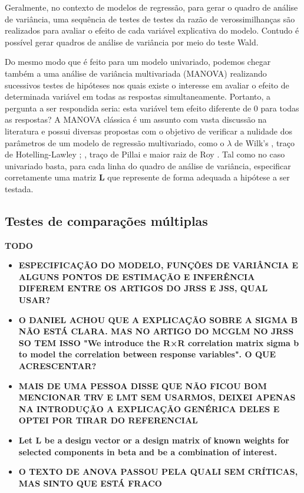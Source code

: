 Geralmente, no contexto de modelos de regressão, para gerar o quadro de análise de variância, uma sequência de testes de testes da razão de verossimilhanças são realizados para avaliar o efeito de cada variável explicativa do modelo. Contudo é possível gerar quadros de análise de variância por meio do teste Wald. 

Do mesmo modo que é feito para um modelo univariado, podemos chegar também a uma análise de variância multivariada (MANOVA) realizando sucessivos testes de hipóteses nos quais existe o interesse em avaliar o efeito de determinada variável em todas as respostas simultaneamente. Portanto, a pergunta a ser respondida seria: esta variável tem efeito diferente de 0 para todas as respostas? A MANOVA clássica \citep{manova} é um assunto com vasta discussão na literatura e possui diversas propostas com o objetivo de verificar a nulidade dos parâmetros de um modelo de regressão multivariado, como o $\lambda$ de Wilk's \citep{wilks}, traço de Hotelling-Lawley \citep{lawley}; \citep{hotelling}, traço de Pillai \citep{pillai} e maior raiz de Roy \citep{roy}. Tal como no caso univariado basta, para cada linha do quadro de análise de variância, especificar corretamente uma matriz $\boldsymbol{L}$ que represente de forma adequada a hipótese a ser testada.

\subsection{Testes de comparações múltiplas}


\textbf{TODO}


\vspace{10cm}

\begin{itemize}
  
  \item \textbf{ESPECIFICAÇÃO DO MODELO, FUNÇÕES DE VARIÂNCIA E ALGUNS PONTOS DE ESTIMAÇÃO E INFERÊNCIA DIFEREM ENTRE OS ARTIGOS DO JRSS E JSS, QUAL USAR?}
  
  \item \textbf{O DANIEL ACHOU QUE A EXPLICAÇÃO SOBRE A SIGMA B NÃO ESTÁ CLARA. MAS NO ARTIGO DO MCGLM NO JRSS SO TEM ISSO "We introduce the R×R correlation matrix sigma b to model the correlation between response variables". O QUE ACRESCENTAR?}
  
  \item \textbf{MAIS DE UMA PESSOA DISSE QUE NÃO FICOU BOM MENCIONAR TRV E LMT SEM USARMOS, DEIXEI APENAS NA INTRODUÇÃO A EXPLICAÇÃO GENÉRICA DELES E OPTEI POR TIRAR DO REFERENCIAL}
  
  \item \textbf{Let L be a design vector or a design matrix of known weights for selected components in beta and be a combination of interest.}
  
  \item \textbf{O TEXTO DE ANOVA PASSOU PELA QUALI SEM CRÍTICAS, MAS SINTO QUE ESTÁ FRACO}
  
\end{itemize}
